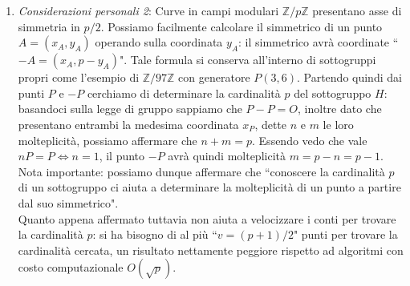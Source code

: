 \documentclass[a4paper,12pt]{tesiinfo}
\begin{document}
\begin{enumerate}
 \item \textit{Considerazioni personali 2}: Curve in campi modulari $\mathbb{Z}/p\mathbb{Z}$ presentano asse di simmetria in $p \big / 2$. Possiamo facilmente calcolare il simmetrico di un punto $A = (x_A, y_A)$ operando sulla coordinata $y_A$: il simmetrico avr\`a coordinate ``$-A = (x_A, p-y_A)$". Tale formula si conserva all'interno di sottogruppi propri come l'esempio di $\mathbb{Z}/97\mathbb{Z}$ con generatore $P(3, 6)$. Partendo quindi dai punti $P$ e $-P$ cerchiamo di determinare la cardinalit\`a $p$ del sottogruppo $H$: basandoci sulla legge di gruppo sappiamo che $P-P = O$, inoltre dato che presentano entrambi la medesima coordinata $x_P$, dette $n$ e $m$ le loro molteplicit\`a, possiamo affermare che $n+m = p$. Essendo vedo che vale $nP = P \iff n=1$, il punto $-P$ avr\`a quindi molteplicit\`a $m = p-n = p-1$. Nota importante: possiamo dunque affermare che ``conoscere la cardinalit\`a $p$ di un sottogruppo ci aiuta a determinare la molteplicit\`a di un punto a partire dal suo simmetrico". 
 \\
 Quanto appena affermato tuttavia non aiuta a velocizzare i conti per trovare la cardinalit\`a $p$: si ha bisogno di al pi\`u ``$v = (p +1)\big /2$" punti per trovare la cardinalit\`a cercata, un risultato nettamente peggiore rispetto ad algoritmi con costo computazionale $O(\sqrt{p})$.
\end{enumerate}
\end{document}
